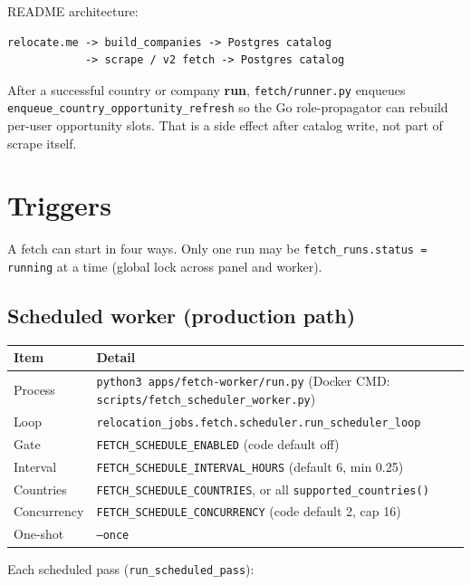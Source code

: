 \documentclass[11pt,a4paper]{article}
\begin{document}
README architecture:

\begin{lstlisting}
relocate.me -> build_companies -> Postgres catalog
            -> scrape / v2 fetch -> Postgres catalog
\end{lstlisting}

After a successful country or company \textbf{run},
\texttt{fetch/runner.py} enqueues
\texttt{enqueue\_country\_opportunity\_refresh} so the Go role-propagator can
rebuild per-user opportunity slots. That is a side effect after catalog write,
not part of scrape itself.

\section{Triggers}

A fetch can start in four ways. Only one run may be
\texttt{fetch\_runs.status = running} at a time (global lock across panel and
worker).

\subsection{Scheduled worker (production path)}

\begin{center}
\begin{tabularx}{\textwidth}{l X}
  \toprule
  \textbf{Item} & \textbf{Detail} \\
  \midrule
  Process &
    \texttt{python3 apps/fetch-worker/run.py}
    (Docker CMD: \texttt{scripts/fetch\_scheduler\_worker.py}) \\
  Loop &
    \texttt{relocation\_jobs.fetch.scheduler.run\_scheduler\_loop} \\
  Gate &
    \texttt{FETCH\_SCHEDULE\_ENABLED} (code default off) \\
  Interval &
    \texttt{FETCH\_SCHEDULE\_INTERVAL\_HOURS} (default 6, min 0.25) \\
  Countries &
    \texttt{FETCH\_SCHEDULE\_COUNTRIES}, or all
    \texttt{supported\_countries()} \\
  Concurrency &
    \texttt{FETCH\_SCHEDULE\_CONCURRENCY}
    (code default 2, cap 16) \\
  One-shot &
    \texttt{--once} \\
  \bottomrule
\end{tabularx}
\end{center}

Each scheduled pass (\texttt{run\_scheduled\_pass}):
\end{document}
